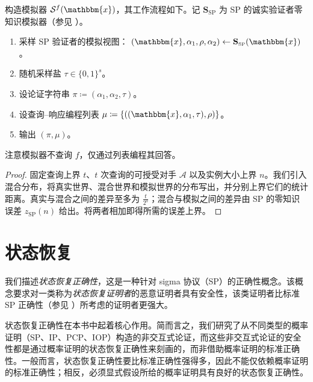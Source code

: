 \documentclass[american,singlepageview]{snargs-book-zh}
\newcommand{\Bits}{\{0,1\}}
\newcommand{\DefineEqual}{\coloneqq}
\newcommand{\Instance}{\mathbbm{x}}
\newcommand{\InstanceSize}{n}
\newcommand{\ProtoAdversary}{A}
\newcommand{\ProtoSimulator}{S}
\newcommand{\ProtoSalt}{\tau}
\newcommand{\ProtoZKError}{z}
\newcommand{\SPSubscript}{\scriptscriptstyle\mathrm{SP}}
\newcommand{\SPFormat}[1]{\mathbf{#1}}
\newcommand{\SPSimulator}{\SPFormat{\ProtoSimulator}_{\SPSubscript}}
\newcommand{\SPZKError}{\ProtoZKError_{\SPSubscript}}
\newcommand{\SPCommitment}{\alpha_{1}}
\newcommand{\SPChallenge}{\rho}
\newcommand{\SPResponse}{\alpha_{2}}
\newcommand{\ARGFormat}[1]{\mathcal{#1}}
\newcommand{\ARGSimulator}{\ARGFormat{\ProtoSimulator}}
\newcommand{\ARGAdversary}{\ARGFormat{\ProtoAdversary}}
\newcommand{\ARGString}{\pi}
\newcommand{\ARGZKProgrammedList}{\ProgrammedList}
\newcommand{\ROFunction}{f}
\newcommand{\ROQueryBound}{t}
\newcommand{\ProgrammedList}{\mu}
\newcommand{\RandSaltString}{\ProtoSalt}
\newcommand{\RandSaltSize}{s}
\newcommand{\SPFSARGString}{(\SPCommitment,\SPResponse,\RandSaltString)}
\begin{document}
\begin{construction}
\label{construction:narg-from-sp-simulator}
构造模拟器
\(\ARGSimulator^{\ROFunction}(\Instance)\)，其工作流程如下。记 $\SPSimulator$ 为 SP 的诚实验证者零知识模拟器（参见 ）。
\begin{enumerate}[nolistsep]
  \item 采样 SP 验证者的模拟视图：
    \((\Instance,\SPCommitment,\SPChallenge,\SPResponse)\gets\SPSimulator(\Instance)\)。
  \item 随机采样盐
    \(\RandSaltString\in\Bits^{\RandSaltSize}\)。
  \item 设论证字符串
    \(\ARGString\DefineEqual\SPFSARGString\)。
  \item 设查询–响应编程列表
    \(\ARGZKProgrammedList\DefineEqual\{((\Instance,\SPCommitment,\RandSaltString),\SPChallenge)\}\)。
  \item 输出 \((\ARGString,\ARGZKProgrammedList)\)。
\end{enumerate}
注意模拟器不查询 $\ROFunction$，仅通过列表编程其回答。
\end{construction}

\begin{proof}
固定查询上界 $\ROQueryBound$、$\ROQueryBound$ 次查询的可授受对手 $\ARGAdversary$ 以及实例大小上界 $\InstanceSize$。我们引入混合分布，将真实世界、混合世界和模拟世界的分布写出，并分别上界它们的统计距离。真实与混合之间的差异至多为 $\frac{\ROQueryBound}{2^{\RandSaltSize}}$；混合与模拟之间的差异由 SP 的零知识误差 $\SPZKError(\InstanceSize)$ 给出。将两者相加即得所需的误差上界。
\end{proof}

\chapter{状态恢复}
\label{chapter:fs-for-sp-sr}

我们描述\emph{状态恢复正确性}，这是一种针对 sigma 协议（SP）的正确性概念。该概念要求对一类称为\emph{状态恢复证明者}的恶意证明者具有安全性，该类证明者比标准 SP 正确性（参见 ）所考虑的证明者更强大。

状态恢复正确性在本书中起着核心作用。简而言之，我们研究了从不同类型的概率证明（SP、IP、PCP、IOP）构造的非交互式论证，而这些非交互式论证的安全性都是通过概率证明的状态恢复正确性来刻画的，而非借助概率证明的标准正确性。一般而言，状态恢复正确性要比标准正确性强得多，因此不能仅依赖概率证明的标准正确性；相反，必须显式假设所给的概率证明具有良好的状态恢复正确性。
\end{document}
